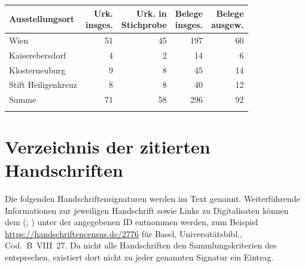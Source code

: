 \begin{tabularx}{\linewidth}{X r r r r}
\lsptoprule
Ausstellungsort
	& \makecell{Urk.\\ insges.}
	& \makecell{Urk. in\\ Stichprobe}
	& \makecell{Belege\\ insges.}
	& \makecell{Belege\\ ausgew.}
	\\
\midrule

Wien
	& 51
	& 45
	& 197
	& 60
	\\

Kaiserebersdorf
	& 4
	& 2
	& 14
	& 6
	\\

Klosterneuburg
	& 9
	& 8
	& 45
	& 14
	\\

Stift Heiligenkreuz
	& 8
	& 8
	& 40
	& 12
	\\

\midrule

Summe
	& 71
	& 58
	& 296
	& 92
	\\

\lspbottomrule
\end{tabularx}



\chapter{Verzeichnis der zitierten Handschriften}
\label{ch:hssverz}

Die folgenden Handschriftensignaturen werden im Text genannt. Weiterführende
Informationen zur jeweiligen Handschrift sowie Links zu
Digitalisaten können dem  (;
\nosh\cite{hsc}) unter der angegebenen ID entnommen werden, zum Beispiel
\url{https://handschriftencensus.de/2776} für Basel, Universitätsbibl.,
Cod.~B~VIII~27. Da nicht alle Handschriften den Sammlungskriterien des
 entsprechen, existiert dort nicht zu jeder genannten Sig\-natur ein
Eintrag.\\

